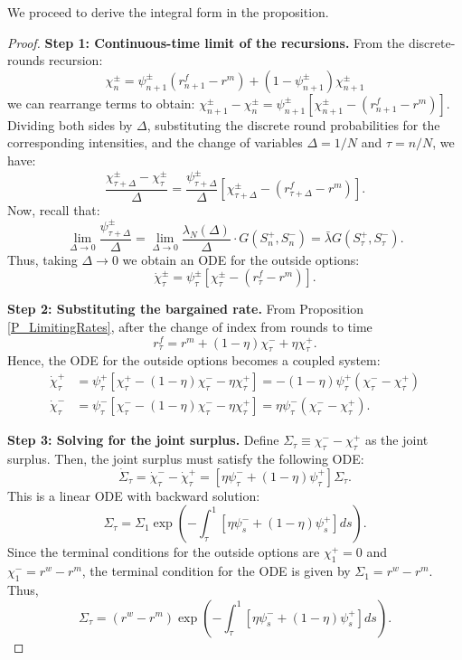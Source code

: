 We proceed to derive the integral form in the proposition. 
\begin{proof}
\textbf{Step 1: Continuous-time limit of the recursions.} From the discrete-rounds recursion:
\[
\chi_{n}^{\pm} = \psi_{n+1}^{\pm}(r_{n+1}^{f} - r^{m}) + (1-\psi_{n+1}^{\pm})\chi_{n+1}^{\pm}
\]
we can rearrange terms to obtain: $\chi_{n+1}^{\pm} - \chi_{n}^{\pm} = \psi_{n+1}^{\pm}[\chi_{n+1}^{\pm} - (r_{n+1}^{f} - r^{m})].$
Dividing both sides by $\Delta$, substituting the discrete round probabilities for the corresponding intensities, and the change of variables $\Delta = 1/N$ and $\tau = n/N$, we have:
\[\frac{\chi_{\tau+\Delta}^{\pm} - \chi_{\tau}^{\pm}}{\Delta} = \frac{\psi^{\pm}_{\tau+\Delta}}{\Delta}[\chi_{\tau+\Delta}^{\pm} - (r_{\tau+\Delta}^{f} - r^{m})].
\]
Now, recall that:
\[
\lim_{\Delta \to 0}\frac{\psi^{\pm}_{\tau+\Delta}}{\Delta}=\lim_{\Delta \to 0}\frac{\lambda_N(\Delta)}{\Delta}\cdot G(S^{+}_{n},S^{-}_{n})=\bar{\lambda}G(S^{+}_{\tau},S^{-}_{\tau}).
\]
Thus, taking $\Delta \to 0$ we obtain an ODE for the outside options:
\[
\dot{\chi}_{\tau}^{\pm} = \psi_{\tau}^{\pm}[\chi_{\tau}^{\pm} - (r_{\tau}^{f} - r^{m})].
\]

\textbf{Step 2: Substituting the bargained rate.} From Proposition \ref{P_LimitingRates}, after the change of index from rounds to time
\[
r_{\tau}^{f} = r^{m} + (1-\eta)\chi_{\tau}^{-} + \eta\chi_{\tau}^{+}.\]
Hence, the ODE for the outside options becomes a coupled system:
\begin{align}
\label{eq:appendix.ODEsystem}
\dot{\chi}_{\tau}^{+} &= \psi_{\tau}^{+}[\chi_{\tau}^{+} - (1-\eta)\chi_{\tau}^{-} - \eta\chi_{\tau}^{+}] = -(1-\eta)\psi_{\tau}^{+}(\chi_{\tau}^{-} - \chi_{\tau}^{+})\\
\label{eq:appendix.ODEsystem2}
\dot{\chi}_{\tau}^{-} &= \psi_{\tau}^{-}[\chi_{\tau}^{-} - (1-\eta)\chi_{\tau}^{-} - \eta\chi_{\tau}^{+}] = \eta\psi_{\tau}^{-}(\chi_{\tau}^{-} - \chi_{\tau}^{+}).
\end{align}

\textbf{Step 3: Solving for the joint surplus.} Define $\Sigma_{\tau} \equiv \chi_{\tau}^{-} - \chi_{\tau}^{+}$ as the joint surplus. Then, the joint surplus must satisfy the following ODE:
\[
\dot{\Sigma}_{\tau} = \dot{\chi}_{\tau}^{-} - \dot{\chi}_{\tau}^{+} = [\eta\psi_{\tau}^{-} + (1-\eta)\psi_{\tau}^{+}]\Sigma_{\tau}.
\]
This is a linear ODE with backward solution:
\[
\Sigma_{\tau} = \Sigma_1 \exp\left(-\int_{\tau}^{1}[\eta\psi_{s}^{-} + (1-\eta)\psi_{s}^{+}]ds\right).
\]
Since the terminal conditions for the outside options are $\chi_{1}^{+} = 0$ and $\chi_{1}^{-} = r^{w} - r^{m}$, the terminal condition for the ODE is given by $\Sigma_1 = r^{w} - r^{m}$. Thus,
\begin{equation}
\label{eq:appendix.surplusintegral}
\Sigma_{\tau} = (r^{w} - r^{m})\exp\left(-\int_{\tau}^{1}[\eta\psi_{s}^{-} + (1-\eta)\psi_{s}^{+}]ds\right).
\end{equation}


\end{proof}
